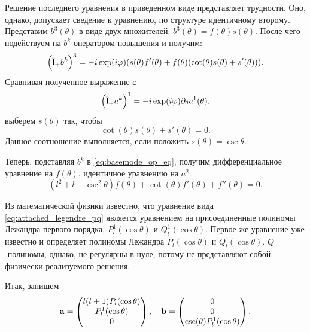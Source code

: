 \documentclass[12pt,a4paper]{article}
\begin{document}
        Решение последнего уравнения в приведенном виде представляет трудности. Оно, однако, допускает сведение к уравнению, по структуре идентичному второму. Представим $b^3(\theta)$ в виде двух множителей: $b^3(\theta) = f(\theta) s(\theta)$. После чего подействуем на $b^k$ оператором повышения и получим:
        \begin{equation}
            \qty(\hat{\mathbf{l}}_{+} b^k)^3 = - i \exp(i \varphi) \qty(
                s(\theta) f'(\theta) + f(\theta) \qty(\cot(\theta) s(\theta) + s'(\theta))
            ) .
        \end{equation}
        Сравнивая полученное выражение с
        \begin{equation}
            \qty(\hat{\mathbf{l}}_{+} a^k)^1 = - i \exp(i \varphi) \partial_\theta a^1(\theta) ,
        \end{equation}
        выберем $s(\theta)$ так, чтобы
        \begin{equation}
            \cot(\theta) s(\theta) + s'(\theta) = 0 .
        \end{equation}
        Данное соотношение выполняется, если положить $s(\theta) = \csc\theta$.

        Теперь, подставляя $b^k$ в \autoref{eq:basemode_op_eq}, получим дифференциальное уравнение на $f(\theta)$, идентичное уравнению на $a^2$:
        \begin{equation}\label{eq:attached_legendre_pq}
            (l^2 + l - \csc^2\theta) f(\theta) + \cot(\theta) f'(\theta) + f''(\theta) = 0.
        \end{equation}

        Из математической физики известно, что уравнение вида \autoref{eq:attached_legendre_pq} является уравнением на присоединенные полиномы Лежандра первого порядка, $P_l^1(\cos\theta)$ и $Q_l^1(\cos\theta)$. Первое же уравнение уже известно и определяет полиномы Лежандра $P_l(\cos\theta)$ и $Q_l(\cos\theta)$. $Q$-полиномы, однако, не регулярны в нуле, потому не представляют собой физически реализуемого решения.

        Итак, запишем
        \begin{equation}
            \vb{a} = \begin{pmatrix}
                l (l + 1) P_l(\cos\theta) \\
                P_l^1(\cos\theta) \\
                0
            \end{pmatrix} , \quad
            \vb{b} = \begin{pmatrix}
                0 \\
                0 \\
                \csc(\theta) P_l^1(\cos\theta)
            \end{pmatrix} .
        \end{equation}
\end{document}
